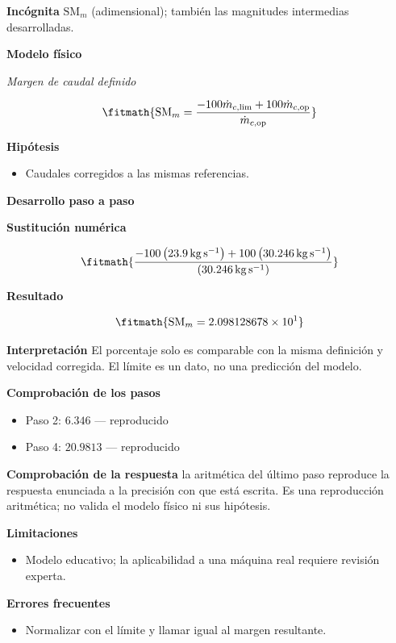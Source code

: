 \documentclass[10pt,openany]{book}
\begin{document}
\noindent\textbf{Incógnita}
$\mathrm{SM}_m$ (adimensional); también las magnitudes intermedias desarrolladas.

\noindent\textbf{Modelo físico}

\noindent\textit{Margen de caudal definido}

\[
\fitmath{\mathrm{SM}_m=\frac{- 100 \dot{m}_{c,\mathrm{lim}} + 100 \dot{m}_{c,\mathrm{op}}}{\dot{m}_{c,\mathrm{op}}}}
\]

\noindent\textbf{Hipótesis}
\begin{itemize}
\item Caudales corregidos a las mismas referencias.
\end{itemize}

\noindent\textbf{Desarrollo paso a paso}



\noindent\textbf{Sustitución numérica}

\[
\fitmath{\frac{- 100 \left(23.9\,\mathrm{kg}\,\mathrm{s}^{-1}\right) + 100 \left(30.246\,\mathrm{kg}\,\mathrm{s}^{-1}\right)}{\left(30.246\,\mathrm{kg}\,\mathrm{s}^{-1}\right)}}
\]

\noindent\textbf{Resultado}

\[
\fitmath{\mathrm{SM}_m=2.098128678\times10^{1}}
\]

\noindent\textbf{Interpretación}
El porcentaje solo es comparable con la misma definición y velocidad corregida. El límite es un dato, no una predicción del modelo.

\noindent\textbf{Comprobación de los pasos}
\begin{itemize}
\item Paso 2: $6.346$ — reproducido
\item Paso 4: $20.9813$ — reproducido
\end{itemize}

\noindent\textbf{Comprobación de la respuesta} la aritmética del último paso reproduce la respuesta enunciada a la precisión con que está escrita. Es una reproducción aritmética; no valida el modelo físico ni sus hipótesis.

\noindent\textbf{Limitaciones}
\begin{itemize}
\item Modelo educativo; la aplicabilidad a una máquina real requiere revisión experta.
\end{itemize}

\noindent\textbf{Errores frecuentes}
\begin{itemize}
\item Normalizar con el límite y llamar igual al margen resultante.
\end{itemize}
\end{document}
